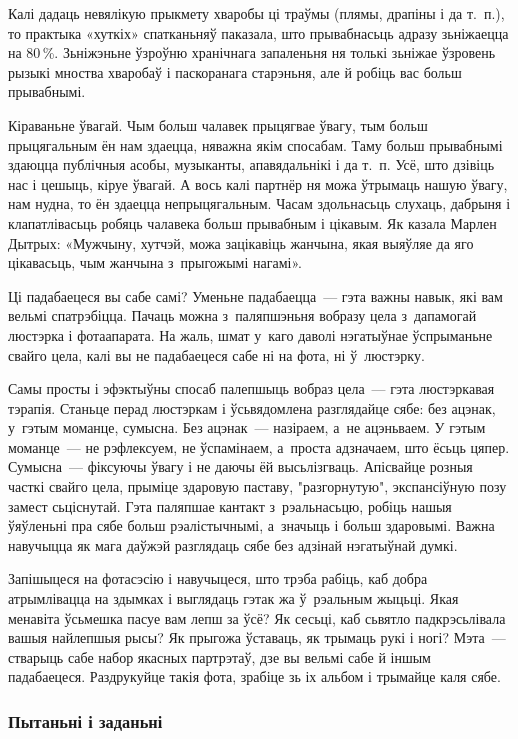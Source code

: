 Калі дадаць невялікую прыкмету хваробы ці траўмы (плямы, драпіны і да т.~п.), то практыка «хуткіх» спатканьняў паказала, што прывабнасьць адразу зьніжаецца на 80\,\%. Зьніжэньне ўзроўню хранічнага запаленьня ня толькі зьніжае ўзровень рызыкі мноства хваробаў і паскоранага старэньня, але й робіць вас больш прывабнымі.

Кіраваньне ўвагай. Чым больш чалавек прыцягвае ўвагу, тым больш прыцягальным ён нам здаецца, няважна якім спосабам. Таму больш прывабнымі здаюцца публічныя асобы, музыканты, апавядальнікі і да т.~п. Усё, што дзівіць нас і цешыць, кіруе ўвагай. А вось калі партнёр ня можа ўтрымаць нашую ўвагу, нам нудна, то ён здаецца непрыцягальным. Часам здольнасьць слухаць, дабрыня і клапатлівасьць робяць чалавека больш прывабным і цікавым. Як казала Марлен Дытрых: «Мужчыну, хутчэй, можа зацікавіць жанчына, якая выяўляе да яго цікавасьць, чым жанчына з~прыгожымі нагамі».

Ці падабаецеся вы сабе самі? Уменьне падабаецца~--- гэта важны навык, які вам вельмі спатрэбіцца. Пачаць можна з~паляпшэньня вобразу цела з~дапамогай люстэрка і фотаапарата. На жаль, шмат у~каго даволі нэгатыўнае ўспрыманьне свайго цела, калі вы не падабаецеся сабе ні на фота, ні ў~люстэрку.

Самы просты і эфэктыўны спосаб палепшыць вобраз цела~--- гэта люстэркавая тэрапія. Станьце перад люстэркам і ўсьвядомлена разглядайце сябе: без ацэнак, у~гэтым моманце, сумысна. Без ацэнак~--- назіраем, а~не ацэньваем. У гэтым моманце~--- не рэфлексуем, не ўспамінаем, а~проста адзначаем, што ёсьць цяпер. Сумысна~--- фіксуючы ўвагу і не даючы ёй высьлізгваць. Апісвайце розныя часткі свайго цела, прыміце здаровую паставу, "разгорнутую", экспансіўную позу замест сьціснутай. Гэта паляпшае кантакт з~рэальнасьцю, робіць нашыя ўяўленьні пра сябе больш рэалістычнымі, а~значыць і больш здаровымі. Важна навучыцца як мага даўжэй разглядаць сябе без адзінай нэгатыўнай думкі.

Запішыцеся на фотасэсію і навучыцеся, што трэба рабіць, каб добра атрымлівацца на здымках і выглядаць гэтак жа ў~рэальным жыцьці. Якая менавіта ўсьмешка пасуе вам лепш за ўсё? Як сесьці, каб сьвятло падкрэсьлівала вашыя найлепшыя рысы? Як прыгожа ўставаць, як трымаць рукі і ногі? Мэта~--- стварыць сабе набор якасных партрэтаў, дзе вы вельмі сабе й іншым падабаецеся. Раздрукуйце такія фота, зрабіце зь іх альбом і трымайце каля сябе.

\subsubsection{Пытаньні і заданьні}

